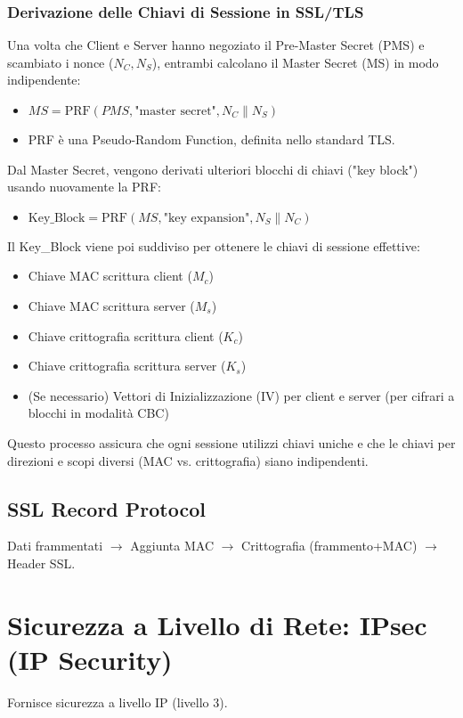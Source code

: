 \subsubsection{Derivazione delle Chiavi di Sessione in SSL/TLS}
\label{ssubsec:ssl_key_derivation}
Una volta che Client e Server hanno negoziato il Pre-Master Secret (PMS) e scambiato i nonce ($N_C, N_S$), entrambi calcolano il Master Secret (MS) in modo indipendente:
\begin{itemize}
    \item $MS = \text{PRF}(PMS, \text{"master secret"}, N_C \| N_S)$
    \item PRF è una Pseudo-Random Function, definita nello standard TLS.
\end{itemize}
Dal Master Secret, vengono derivati ulteriori blocchi di chiavi ("key block") usando nuovamente la PRF:
\begin{itemize}
    \item $\text{Key\_Block} = \text{PRF}(MS, \text{"key expansion"}, N_S \| N_C)$
\end{itemize}
Il Key\_Block viene poi suddiviso per ottenere le chiavi di sessione effettive:
\begin{itemize}
    \item Chiave MAC scrittura client ($M_c$)
    \item Chiave MAC scrittura server ($M_s$)
    \item Chiave crittografia scrittura client ($K_c$)
    \item Chiave crittografia scrittura server ($K_s$)
    \item (Se necessario) Vettori di Inizializzazione (IV) per client e server (per cifrari a blocchi in modalità CBC)
\end{itemize}
Questo processo assicura che ogni sessione utilizzi chiavi uniche e che le chiavi per direzioni e scopi diversi (MAC vs. crittografia) siano indipendenti.

\subsection{SSL Record Protocol}
Dati frammentati $\rightarrow$ Aggiunta MAC $\rightarrow$ Crittografia (frammento+MAC) $\rightarrow$ Header SSL.

\section{Sicurezza a Livello di Rete: IPsec (IP Security)}
\label{sec:ipsec}
Fornisce sicurezza a livello IP (livello 3).

